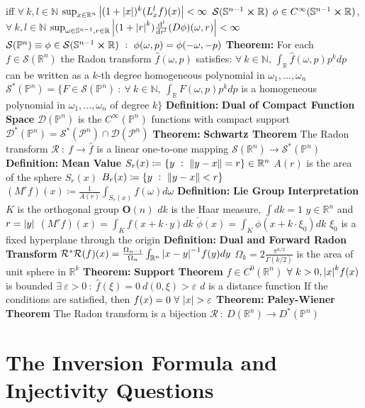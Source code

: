 \documentclass[14pt]{extarticle}
\def\Definition{{\color{blue} \textbf{Definition:} }}
\def\Theorem{{\color{red} \textbf{Theorem:} }}
\begin{document}
\begin{outline}
						iff $\forall~k,l \in \mathbb{N}$
				\3	$\sup_{x \in \mathbb{R}^n}\abs{(1 + \abs{x})^k(L_x^lf)(x)} < \infty$
			\2	$\mathcal{S}(\mathbb{S}^{n-1} \cross \mathbb{R})$ 
				\3	$\phi \in C^{\infty}(\mathbb{S}^{n-1} \cross \mathbb{R})$, $\forall~k,l \in \mathbb{N}$
				\3	$\sup_{\omega \in \mathbb{S}^{n-1},r \in \mathbb{R}} 
						\abs{(1 + \abs{r}^k) \od[l]{}{r}(D\phi)(\omega,r)} < \infty$
			\2	$\mathcal{S}(\mathbb{P}^n) \equiv \phi \in \mathcal{S}(\mathbb{S}^{n-1} \cross \mathbb{R})
					~:~\phi(\omega,p) = \phi(-\omega,-p)$
		\1	\Theorem For each $f \in \mathcal{S}(\mathbb{R}^n)$ the Radon transform
				$\hat{f}(\omega,p)$ satisfies: $\forall~k \in \mathbb{N}$, 
				$\int_{\mathbb{R}}\hat{f}(\omega,p)p^kdp$ can be written as a $k$-th
				degree homogeneous polynomial in $\omega_1,...,\omega_n$
				\2	$\mathcal{S}^*(\mathbb{P}^n) = \{F \in \mathcal{S}(\mathbb{P}^n)~:~
				\forall~k \in \mathbb{N},~\int_{\mathbb{R}}F(\omega,p)p^k dp$ is a
				homogeneous polynomial in $\omega_1,...,\omega_n$ of degree $k\}$
		\1	\Definition \textbf{Dual of Compact Function Space}
			\2	$\mathcal{D}(\mathbb{P}^n)$ is the $C^{\infty}(\mathbb{P}^n)$ functions with compact support
			\2	$\mathcal{D}^*(\mathbb{P}^n) = \mathcal{S}^*(\mathcal{P}^n) \cap \mathcal{D}(\mathcal{P}^n)$ 
		\1	\Theorem \textbf{Schwartz Theorem}
			\2	The Radon transform $\mathcal{R}~:~f \rightarrow \hat{f}$ is a linear
					one-to-one mapping $\mathcal{S}(\mathbb{R}^n) \rightarrow \mathcal{S}^*(\mathbb{P}^n)$
		\1	\Definition \textbf{Mean Value}
			\2	$S_r(x) \coloneqq \{y~:~\norm{y - x} = r\} \in \mathbb{R}^n$
			\2	$A(r)$ is the area of the sphere $S_r(x)$
			\2	$B_r(x) \coloneqq \{y~:~\norm{y - x} < r\}$
			\2	$(M^rf)(x) \coloneqq \frac{1}{A(r)}\int_{S_r(x)}f(\omega)d\omega$
			\2	\Definition \textbf{Lie Group Interpretation}
				\3	$K$ is the orthogonal group $\bm{O}(n)$
				\3	$dk$ is the Haar measure, $\int dk = 1$
				\3	$y \in \mathbb{R}^n$ and $r = \abs{y}$
				\3	$(M^rf)(x) = \int_K f(x + k \cdot y)dk$
				\3	$\check{\phi}(x) = \int_K \phi(x + k \cdot \xi_0)dk$
					\4	$\xi_0$ is a fixed hyperplane through the origin
		\1	\Definition \textbf{Dual and Forward Radon Transform}
			\2	$\mathcal{R}^*\mathcal{R}(f)(x) = 
				\frac{\Omega_{n-1}}{\Omega_n}\int_{\mathbb{R}^n}\abs{x - y}^{-1}f(y)dy$
				\3	$\Omega_k = 2 \frac{\pi^{k/2}}{\Gamma(k/2)}$ is the area of unit
						sphere in $\mathbb{R}^k$
		\1	\Theorem \textbf{Support Theorem}
			\2	$f \in C^0(\mathbb{R}^n)$
			\2	$\forall~k > 0, \abs{x}^kf(x)$ is bounded
			\2	$\exists~\varepsilon > 0~:~\hat{f}(\xi) = 0~d(0,\xi) > \varepsilon$
				\3	$d$ is a distance function
			\2	If the conditions are satisfied, then $f(x) = 0~\forall~\abs{x} > \varepsilon$
		\1	\Theorem \textbf{Paley-Wiener Theorem}
			\2	The Radon transform is a bijection $\mathcal{R}~:~D(\mathbb{R}^n) \rightarrow D^*(\mathbb{P}^n)$
	
	\section*{The Inversion Formula and Injectivity Questions}
	\end{outline}
\end{document}
